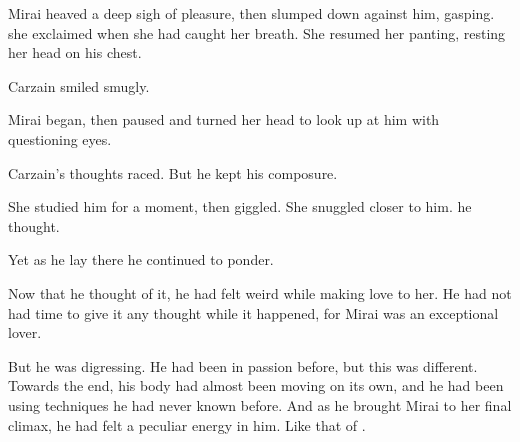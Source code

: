 \begin{comment}
\section{Post-\Bryndwin}
\end{comment}
\begin{comment}
\subsection{Sex with Mirai}
\end{comment}

{}

Mirai heaved a deep sigh of pleasure, then slumped down against him, gasping. 
 she exclaimed when she had caught her breath. 
She resumed her panting, resting her head on his chest. 

Carzain smiled smugly. 

 Mirai began, then paused and turned her head to look up at him with questioning eyes. 

Carzain's thoughts raced. 
But he kept his composure. 

She studied him for a moment, then giggled. 
She snuggled closer to him. 
 he thought. 

Yet as he lay there he continued to ponder. 

Now that he thought of it, he had felt weird while making love to her. 
He had not had time to give it any thought while it happened, for Mirai was an exceptional lover. 

But he was digressing. 
He had been  in passion before, but this was different. 
Towards the end, his body had almost been moving on its own, and he had been using techniques he had never known before. 
And as he brought Mirai to her final climax, he had felt a peculiar energy in him. 
Like that of \Itzach. 


